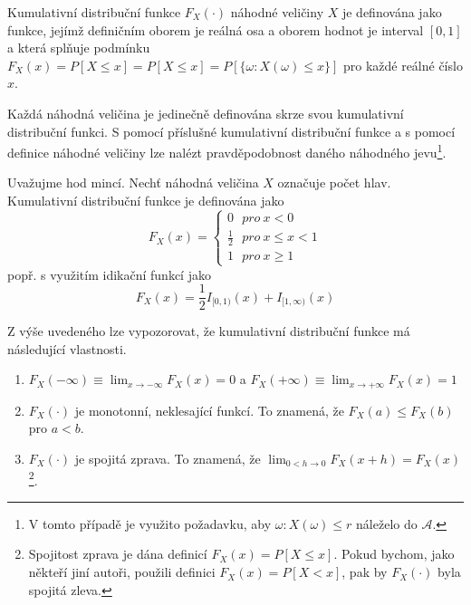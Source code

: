 \begin{definition}
Kumulativní distribuční funkce $F_X(\cdot)$ náhodné veličiny $X$ je definována jako funkce, jejímž definičním oborem je reálná osa a oborem hodnot je interval $[0, 1]$ a která splňuje podmínku $F_X(x) = P[X \le x] = P[X \le x] = P[\{\omega: X(\omega) \le x\}]$ pro každé reálné číslo $x$.
\end{definition}
Každá náhodná veličina je jedinečně definována skrze svou kumulativní distribuční funkci. S pomocí příslušné kumulativní distribuční funkce a s pomocí definice náhodné veličiny lze nalézt pravděpodobnost daného náhodného jevu\footnote{V tomto případě je využito požadavku, aby $\omega: X(\omega) \le r$ náleželo do $\mathscr{A}$.}.

\begin{example}
Uvažujme hod mincí. Nechť náhodná veličina $X$ označuje počet hlav. Kumulativní distribuční funkce je definována jako
\begin{equation*}
F_X(x) =
\begin{cases}
0~~~\textit{pro}~x<0\\
\frac{1}{2}~~~\textit{pro}~x\le x < 1\\
1~~~\textit{pro}~x\ge 1
\end{cases}
\end{equation*}
popř. s využitím idikační funkcí jako
\begin{equation*}
F_X(x) = \frac{1}{2}I_{[0,1)}(x) + I_{[1, \infty)}(x)
\end{equation*}
\end{example}
\begin{definition}
Z výše uvedeného lze vypozorovat, že kumulativní distribuční funkce má následující vlastnosti.
\begin{enumerate}
\item $F_X(-\infty) \equiv \lim_{x \rightarrow -\infty} F_X(x) = 0$ a $F_X(+\infty) \equiv \lim_{x \rightarrow +\infty} F_X(x) = 1$
\item $F_X(\cdot)$ je monotonní, neklesající funkcí. To znamená, že $F_X(a) \le F_X(b)$ pro $a < b$.
\item $F_X(\cdot)$ je spojitá zprava. To znamená, že $\lim_{0 < h \rightarrow 0} F_X(x + h) = F_X(x)$\footnote{Spojitost zprava je dána definicí $F_X(x) = P[X \le x]$. Pokud bychom, jako někteří jiní autoři, použili definici $F_X(x) = P[X < x]$, pak by $F_X(\cdot)$ byla spojitá zleva.}.
\end{enumerate}
\end{definition}

